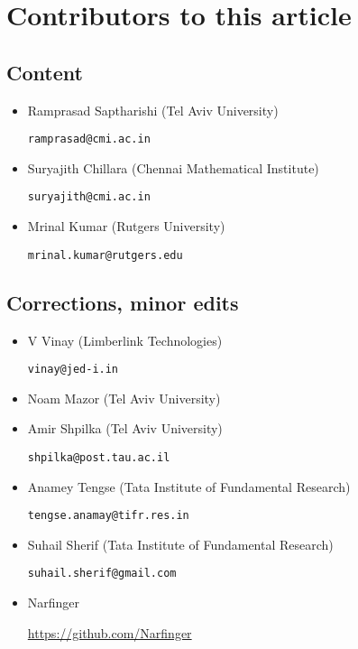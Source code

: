 \chapter*{Contributors to this article}

\section*{Content}

\begin{itemize}
\item Ramprasad Saptharishi (Tel Aviv University)

\texttt{ramprasad@cmi.ac.in}

\item Suryajith Chillara (Chennai Mathematical Institute)

\texttt{suryajith@cmi.ac.in}

\item Mrinal Kumar (Rutgers University)

\texttt{mrinal.kumar@rutgers.edu}


\end{itemize}

\section*{Corrections, minor edits}

\begin{itemize}
\item V Vinay (Limberlink Technologies)

\texttt{vinay@jed-i.in}

\item Noam Mazor (Tel Aviv University)

\item Amir Shpilka (Tel Aviv University)

\texttt{shpilka@post.tau.ac.il}

\item Anamey Tengse (Tata Institute of Fundamental Research)

\texttt{tengse.anamay@tifr.res.in}

\item Suhail Sherif (Tata Institute of Fundamental Research)

\texttt{suhail.sherif@gmail.com}

\item Narfinger

  \url{https://github.com/Narfinger}


\end{itemize}


